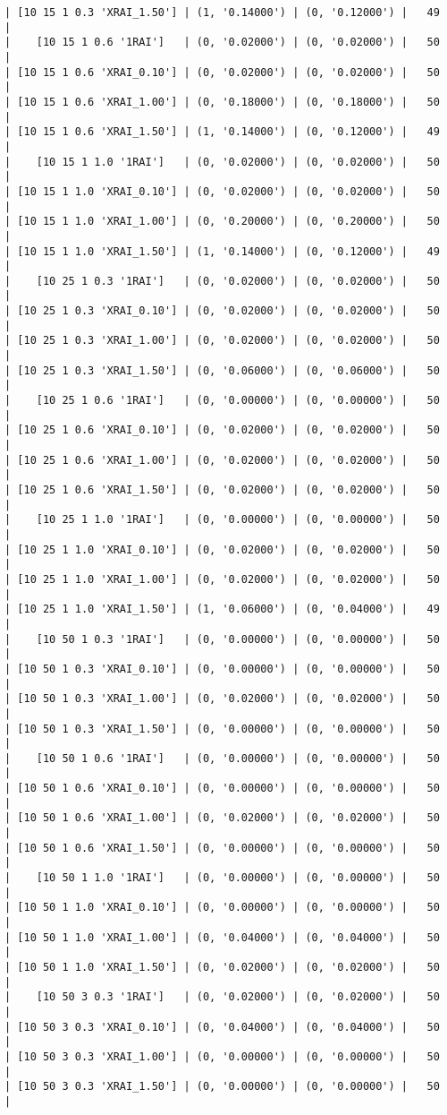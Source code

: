 \documentclass{article}
\begin{document}
\begin{verbatim}
| [10 15 1 0.3 'XRAI_1.50'] | (1, '0.14000') | (0, '0.12000') |   49  |
|    [10 15 1 0.6 '1RAI']   | (0, '0.02000') | (0, '0.02000') |   50  |
| [10 15 1 0.6 'XRAI_0.10'] | (0, '0.02000') | (0, '0.02000') |   50  |
| [10 15 1 0.6 'XRAI_1.00'] | (0, '0.18000') | (0, '0.18000') |   50  |
| [10 15 1 0.6 'XRAI_1.50'] | (1, '0.14000') | (0, '0.12000') |   49  |
|    [10 15 1 1.0 '1RAI']   | (0, '0.02000') | (0, '0.02000') |   50  |
| [10 15 1 1.0 'XRAI_0.10'] | (0, '0.02000') | (0, '0.02000') |   50  |
| [10 15 1 1.0 'XRAI_1.00'] | (0, '0.20000') | (0, '0.20000') |   50  |
| [10 15 1 1.0 'XRAI_1.50'] | (1, '0.14000') | (0, '0.12000') |   49  |
|    [10 25 1 0.3 '1RAI']   | (0, '0.02000') | (0, '0.02000') |   50  |
| [10 25 1 0.3 'XRAI_0.10'] | (0, '0.02000') | (0, '0.02000') |   50  |
| [10 25 1 0.3 'XRAI_1.00'] | (0, '0.02000') | (0, '0.02000') |   50  |
| [10 25 1 0.3 'XRAI_1.50'] | (0, '0.06000') | (0, '0.06000') |   50  |
|    [10 25 1 0.6 '1RAI']   | (0, '0.00000') | (0, '0.00000') |   50  |
| [10 25 1 0.6 'XRAI_0.10'] | (0, '0.02000') | (0, '0.02000') |   50  |
| [10 25 1 0.6 'XRAI_1.00'] | (0, '0.02000') | (0, '0.02000') |   50  |
| [10 25 1 0.6 'XRAI_1.50'] | (0, '0.02000') | (0, '0.02000') |   50  |
|    [10 25 1 1.0 '1RAI']   | (0, '0.00000') | (0, '0.00000') |   50  |
| [10 25 1 1.0 'XRAI_0.10'] | (0, '0.02000') | (0, '0.02000') |   50  |
| [10 25 1 1.0 'XRAI_1.00'] | (0, '0.02000') | (0, '0.02000') |   50  |
| [10 25 1 1.0 'XRAI_1.50'] | (1, '0.06000') | (0, '0.04000') |   49  |
|    [10 50 1 0.3 '1RAI']   | (0, '0.00000') | (0, '0.00000') |   50  |
| [10 50 1 0.3 'XRAI_0.10'] | (0, '0.00000') | (0, '0.00000') |   50  |
| [10 50 1 0.3 'XRAI_1.00'] | (0, '0.02000') | (0, '0.02000') |   50  |
| [10 50 1 0.3 'XRAI_1.50'] | (0, '0.00000') | (0, '0.00000') |   50  |
|    [10 50 1 0.6 '1RAI']   | (0, '0.00000') | (0, '0.00000') |   50  |
| [10 50 1 0.6 'XRAI_0.10'] | (0, '0.00000') | (0, '0.00000') |   50  |
| [10 50 1 0.6 'XRAI_1.00'] | (0, '0.02000') | (0, '0.02000') |   50  |
| [10 50 1 0.6 'XRAI_1.50'] | (0, '0.00000') | (0, '0.00000') |   50  |
|    [10 50 1 1.0 '1RAI']   | (0, '0.00000') | (0, '0.00000') |   50  |
| [10 50 1 1.0 'XRAI_0.10'] | (0, '0.00000') | (0, '0.00000') |   50  |
| [10 50 1 1.0 'XRAI_1.00'] | (0, '0.04000') | (0, '0.04000') |   50  |
| [10 50 1 1.0 'XRAI_1.50'] | (0, '0.02000') | (0, '0.02000') |   50  |
|    [10 50 3 0.3 '1RAI']   | (0, '0.02000') | (0, '0.02000') |   50  |
| [10 50 3 0.3 'XRAI_0.10'] | (0, '0.04000') | (0, '0.04000') |   50  |
| [10 50 3 0.3 'XRAI_1.00'] | (0, '0.00000') | (0, '0.00000') |   50  |
| [10 50 3 0.3 'XRAI_1.50'] | (0, '0.00000') | (0, '0.00000') |   50  |

\end{verbatim}
\end{document}
